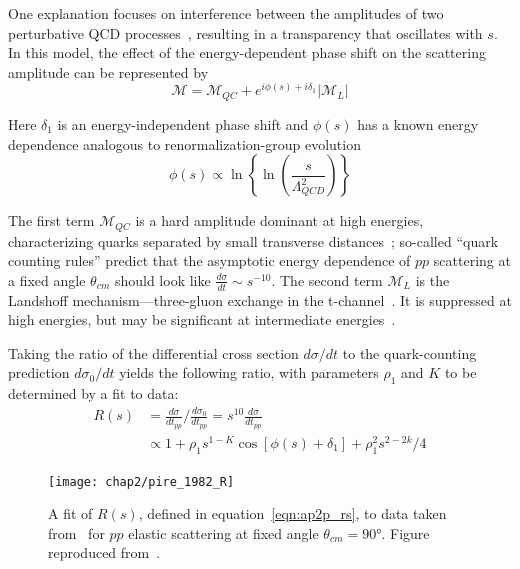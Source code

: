 One explanation focuses on interference between the amplitudes of two
perturbative QCD processes~\cite{Ralston_1988}, resulting in a transparency
that oscillates with $s$.
In this model, the effect of the energy-dependent phase shift on the scattering amplitude can be represented by
\begin{equation}
    \mathcal{M} = \mathcal{M}_{QC} + e^{i\phi(s) + i \delta_1}\left|\mathcal{M}_L\right|
\end{equation}

Here $\delta_1$ is an energy-independent phase shift and $\phi(s)$ has a known
energy dependence analogous to renormalization-group
evolution~\cite{Pire_1982, Ralston_1982, Sen_1983}
\begin{equation}
    \phi(s) \propto \ln\left\{ \ln \left( \frac{s}{\Lambda_{QCD}^2} \right) \right\}
\end{equation}


The first term $\mathcal{M}_{QC}$ is a hard amplitude dominant at high energies,
characterizing quarks separated by small transverse
distances~\cite{Brodsky_1973, Brodsky_1975, Matveev_1973, Lepage_1980};
so-called ``quark counting rules'' predict that the asymptotic energy
dependence of $pp$ scattering at a fixed angle $\theta_{cm}$ should look like
$\frac{d\sigma}{dt}\sim s^{-10}$.
The second term $\mathcal{M}_L$ is the Landshoff mechanism---three-gluon exchange in the
t-channel~\cite{Landshoff_1974, Landshoff_1980}.
It is suppressed at high energies, but may be significant at intermediate
energies~\cite{Mueller_1981}.


Taking the ratio of the differential cross section $d\sigma/dt$ to the
quark-counting prediction $d\sigma_0/dt$
yields the following ratio, with parameters $\rho_1$ and $K$ to be determined
by a fit to data:
\begin{align} \label{eqn:ap2p_rs}
    R(s) &= \frac{d\sigma}{dt_{pp}} \bigg/ \frac{d\sigma_0}{dt_{pp}}
          = s^{10} \frac{d\sigma}{dt_{pp}} \\
         &\propto 1 + \rho_1 s^{1-K} \cos\left[\phi(s)+\delta_1\right] + \rho_1^2 s^{2-2k}/4
\end{align}

\begin{figure}[!h]
    \centering
    \texttt{[image: chap2/pire\_1982\_R]}
    \caption[Fit ratio of the differential cross section $d\sigma/dt$ to the
             quark-counting prediction $d\sigma_0/dt$.]{A fit of $R(s)$, defined in equation~\ref{eqn:ap2p_rs}, to data taken from~\cite{Sivers_1976}
             for $pp$ elastic scattering at fixed angle
             $\theta_{cm}=\ang{90}$.
             Figure reproduced from~\cite{Pire_1982}.
            }
    \label{fig:pire_1982_R}
\end{figure}

